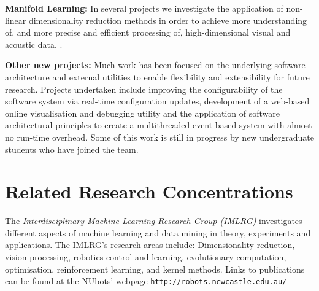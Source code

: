 \documentclass{llncs}
\begin{document}
\noindent\textbf{Manifold Learning:} In several projects we
investigate the application of non-linear dimensionality reduction
methods in order to achieve more understanding of, and more precise
and efficient processing of, high-dimensional visual and acoustic data.
\cite{ChalupEtAl2007b,WongEtAl2012}.%


\noindent\textbf{Other new projects:} Much work has been focused on the underlying software architecture and external utilities to enable flexibility and extensibility for future research. Projects undertaken include improving the configurability of the software system via real-time configuration updates, development of a web-based online visualisation and debugging utility \cite{AnnableEtAl2014} and the application of software architectural principles to create a multithreaded event-based system with almost no run-time overhead. Some of this work is still in progress by new undergraduate students who have joined the team.

\section{Related Research Concentrations}
The \emph{Interdisciplinary Machine Learning Research Group (IMLRG)} investigates different aspects of machine learning and data mining in theory, experiments and applications. The IMLRG's research areas include: Dimensionality reduction, vision processing, robotics control and learning,  evolutionary computation, optimisation, reinforcement learning, and kernel methods. Links to publications can be found at the NUbots' webpage
\texttt{http://robots.newcastle.edu.au/}



\end{document}
